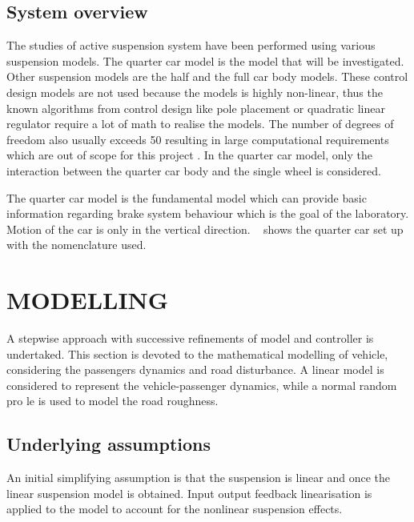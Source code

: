 \documentclass[10pt,twocolumn]{witseiepaper}
\begin{document}
\subsection{System overview}

The studies of active suspension system have been performed using various suspension models. The quarter car model is the model that will be investigated. Other suspension models are the half and the full car body models. These control design models are not used because the models is highly non-linear, thus the known algorithms from control design like pole placement or quadratic linear regulator require a lot of math to realise the models. The number of degrees of freedom also usually exceeds 50 resulting in large computational requirements which are out of scope for this project \cite{Sharp:1987}. In the quarter car model, only the interaction between the quarter car body and the single wheel is considered.

The quarter car model is the fundamental model which can provide basic information regarding brake system behaviour which is the goal of the laboratory. Motion of the car is only in the vertical direction. ~ shows the quarter car set up with the nomenclature used.
 

 
\section{MODELLING}
A stepwise approach with successive refinements of model and controller is undertaked. This section is devoted to the mathematical modelling of vehicle, considering the passengers
dynamics and road disturbance. A linear model is considered to represent the vehicle-passenger
dynamics, while a normal random pro le is used to model the road roughness.

\subsection{Underlying assumptions}

An initial simplifying assumption is that the suspension is linear and once the linear suspension model is obtained. Input output feedback linearisation is applied to the model to account for the nonlinear suspension effects.
\end{document}
